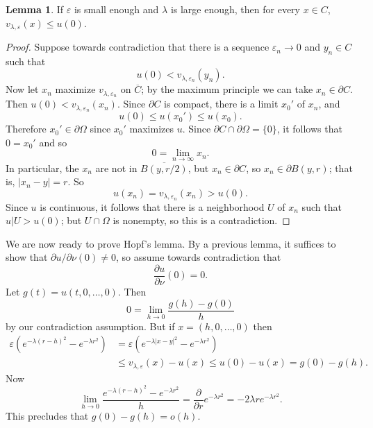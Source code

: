 \documentclass[10pt]{article}
\theoremstyle{definition}
\newtheorem{lemma}{Lemma}[exer]
\begin{document}
\begin{lemma}
If $\varepsilon$ is small enough and $\lambda$ is large enough, then for every $x \in C$, $v_{\lambda,\varepsilon}(x) \leq u(0)$.
\end{lemma}
\begin{proof}
Suppose towards contradiction that there is a sequence $\varepsilon_n \to 0$ and $y_n \in C$ such that
$$u(0) < v_{\lambda,\varepsilon_n}(y_n).$$
Now let $x_n$ maximize $v_{\lambda,\varepsilon_n}$ on $\overline C$; by the maximum principle we can take $x_n \in \partial C$.
Then $u(0) < v_{\lambda,\varepsilon_n}(x_n)$.
Since $\partial C$ is compact, there is a limit $x_0'$ of $x_n$, and
$$u(0) \leq u(x_0') \leq u(x_0).$$
Therefore $x_0' \in \partial \Omega$ since $x_0'$ maximizes $u$.
Since $\partial C \cap \partial \Omega = \{0\}$, it follows that $0 = x_0'$ and so
$$0 = \lim_{n \to \infty} x_n.$$
In particular, the $x_n$ are not in $\overline{B(y,r/2)}$, but $x_n \in \partial C$, so $x_n \in \partial B(y,r)$; that is, $|x_n - y| = r$.
So
$$u(x_n) = v_{\lambda,\varepsilon_n}(x_n) > u(0).$$
Since $u$ is continuous, it follows that there is a neighborhood $U$ of $x_n$ such that $u|U > u(0)$; but $U \cap \Omega$ is nonempty, so this is a contradiction.
\end{proof}

We are now ready to prove Hopf's lemma. By a previous lemma, it suffices to show that $\partial u/\partial \nu(0) \neq 0$, so assume towards contradiction that
$$\frac{\partial u}{\partial \nu}(0) = 0.$$
Let $g(t) = u(t, 0, \dots, 0)$.
Then
$$0 = \lim_{h \to 0} \frac{g(h) - g(0)}{h}$$
by our contradiction assumption. But if $x = (h, 0, \dots, 0)$ then
\begin{align*}
\varepsilon(e^{-\lambda(r-h)^2} - e^{-\lambda r^2}) &= \varepsilon(e^{-\lambda|x-y|^2} - e^{-\lambda r^2})\\
&\leq v_{\lambda,\varepsilon}(x) - u(x) \leq u(0) - u(x)
= g(0) - g(h).
\end{align*}
Now
$$\lim_{h \to 0} \frac{e^{-\lambda(r-h)^2} - e^{-\lambda r^2}}{h} = \frac{\partial }{\partial r} e^{-\lambda r^2} = -2\lambda re^{-\lambda r^2}.$$
This precludes that $g(0) - g(h) = o(h)$.
\end{document}
